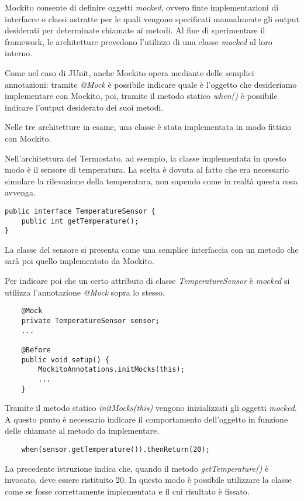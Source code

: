 Mockito consente di definire oggetti \emph{mocked}, ovvero finte implementazioni di interfacce o classi astratte per le quali vengono specificati manualmente gli output desiderati per determinate chiamate ai metodi. Al fine di sperimentare il framework, le architetture prevedono l'utilizzo di una classe \emph{mocked} al loro interno. 

Come nel caso di JUnit, anche Mockito opera mediante delle semplici annotazioni: tramite \emph{@Mock} è possibile indicare quale è l'oggetto che desideriamo implementare con Mockito, poi, tramite il metodo statico \emph{when()} è possibile indicare l'output desiderato dei suoi metodi.

Nelle tre architetture in esame, una classe è stata implementata in modo fittizio con Mockito.

Nell'architettura del Termostato, ad esempio, la classe implementata in questo modo è il sensore di temperatura. La scelta è dovuta al fatto che era necessario simulare la rilevazione della temperatura, non sapendo come in realtà questa cosa avvenga.

\begin{lstlisting}
public interface TemperatureSensor {		
	public int getTemperature();
}
\end{lstlisting}

La classe del sensore si presenta come una semplice interfaccia con un metodo che sarà poi quello implementato da Mockito.

Per indicare poi che un certo attributo di classe \emph{TemperatureSensor} è \emph{mocked} si utilizza l'annotazione \emph{@Mock} sopra lo stesso.

\begin{lstlisting}
	@Mock
	private TemperatureSensor sensor;
	...
	
	@Before
	public void setup() {
		MockitoAnnotations.initMocks(this);
		...
	}
\end{lstlisting}

Tramite il metodo statico \emph{initMocks(this)} vengono inizializzati gli oggetti \emph{mocked}. A questo punto è necessario indicare il comportamento dell'oggetto in funzione delle chiamate al metodo da implementare.

\begin{lstlisting}
	when(sensor.getTemperature()).thenReturn(20);
\end{lstlisting}

La precedente istruzione indica che, quando il metodo \emph{getTemperature()} è invocato, deve essere ristituito 20. In questo modo è possibile utilizzare la classe come se fosse correttamente implementata e il cui risultato è fissato.

